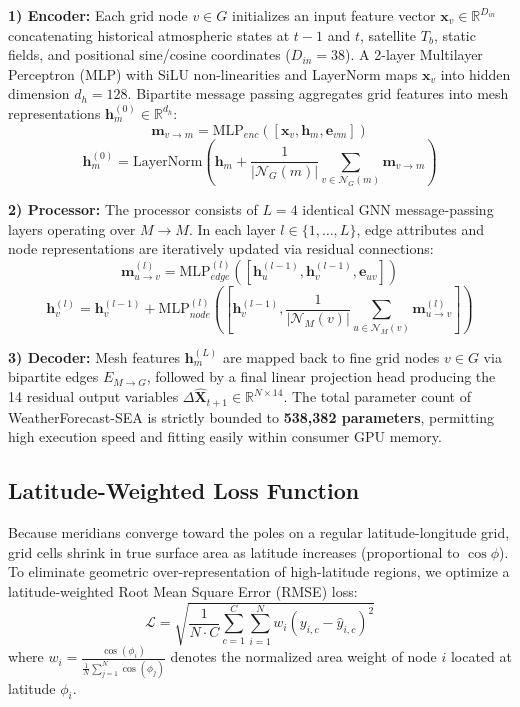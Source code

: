 \textbf{1) Encoder:} Each grid node $v \in G$ initializes an input feature vector $\mathbf{x}_v \in \mathbb{R}^{D_{in}}$ concatenating historical atmospheric states at $t-1$ and $t$, satellite $T_b$, static fields, and positional sine/cosine coordinates ($D_{in} = 38$). A 2-layer Multilayer Perceptron (MLP) with SiLU non-linearities and LayerNorm maps $\mathbf{x}_v$ into hidden dimension $d_h = 128$. Bipartite message passing aggregates grid features into mesh representations $\mathbf{h}_m^{(0)} \in \mathbb{R}^{d_h}$:
\begin{equation}
\mathbf{m}_{v \to m} = \text{MLP}_{enc}\left(\left[\mathbf{x}_v, \mathbf{h}_m, \mathbf{e}_{vm}\right]\right)
\end{equation}
\begin{equation}
\mathbf{h}_m^{(0)} = \text{LayerNorm}\left(\mathbf{h}_m + \frac{1}{|\mathcal{N}_G(m)|} \sum_{v \in \mathcal{N}_G(m)} \mathbf{m}_{v \to m}\right)
\end{equation}

\textbf{2) Processor:} The processor consists of $L = 4$ identical GNN message-passing layers operating over $M \to M$. In each layer $l \in \{1, \dots, L\}$, edge attributes and node representations are iteratively updated via residual connections:
\begin{equation}
\mathbf{m}_{u \to v}^{(l)} = \text{MLP}_{edge}^{(l)}\left(\left[\mathbf{h}_u^{(l-1)}, \mathbf{h}_v^{(l-1)}, \mathbf{e}_{uv}\right]\right)
\end{equation}
\begin{equation}
\mathbf{h}_v^{(l)} = \mathbf{h}_v^{(l-1)} + \text{MLP}_{node}^{(l)}\left(\left[\mathbf{h}_v^{(l-1)}, \frac{1}{|\mathcal{N}_M(v)|} \sum_{u \in \mathcal{N}_M(v)} \mathbf{m}_{u \to v}^{(l)}\right]\right)
\end{equation}

\textbf{3) Decoder:} Mesh features $\mathbf{h}_m^{(L)}$ are mapped back to fine grid nodes $v \in G$ via bipartite edges $E_{M \to G}$, followed by a final linear projection head producing the 14 residual output variables $\Delta \hat{\mathbf{X}}_{t+1} \in \mathbb{R}^{N \times 14}$. The total parameter count of WeatherForecast-SEA is strictly bounded to \textbf{538,382 parameters}, permitting high execution speed and fitting easily within consumer GPU memory.

\subsection{Latitude-Weighted Loss Function}
Because meridians converge toward the poles on a regular latitude-longitude grid, grid cells shrink in true surface area as latitude increases (proportional to $\cos \phi$). To eliminate geometric over-representation of high-latitude regions, we optimize a latitude-weighted Root Mean Square Error (RMSE) loss:
\begin{equation}
\mathcal{L} = \sqrt{\frac{1}{N \cdot C} \sum_{c=1}^C \sum_{i=1}^N w_i \left(y_{i, c} - \hat{y}_{i, c}\right)^2}
\end{equation}
where $w_i = \frac{\cos(\phi_i)}{\frac{1}{N}\sum_{j=1}^N \cos(\phi_j)}$ denotes the normalized area weight of node $i$ located at latitude $\phi_i$.

